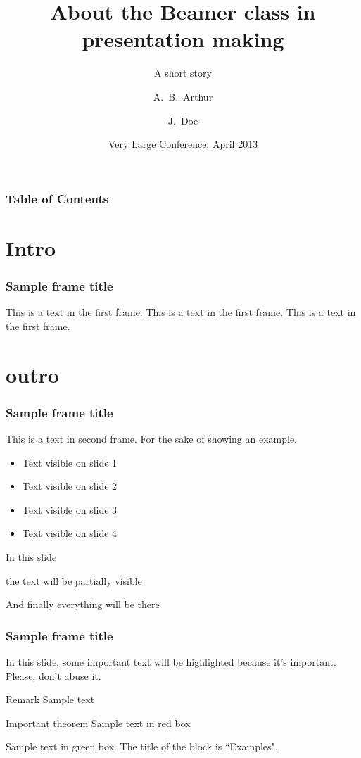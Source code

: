 \documentclass{beamer}
\title[About Beamer] %
{About the Beamer class in presentation making}
\subtitle{A short story}
\author[Arthur, Doe] %
{A.~B.~Arthur\inst{1} \and J.~Doe\inst{2}}
\institute[VFU] %
{
  \inst{1}%
  Faculty of Physics\\
  Very Famous University
  \and
  \inst{2}%
  Faculty of Chemistry\\
  Very Famous University
}
\date[VLC 2013] %
{Very Large Conference, April 2013}
\begin{document}
\frame{\titlepage}

\begin{frame}
\frametitle{Table of Contents}
\tableofcontents
\end{frame}

\section{Intro}

\begin{frame}
\frametitle{Sample frame title}
This is a text in the first frame. This is a text in the first frame. This is a text in the first frame.
\end{frame}

\section{outro}

\begin{frame}
\frametitle{Sample frame title}
This is a text in second frame.
For the sake of showing an example.

\begin{itemize}
 \item<1-> Text visible on slide 1
 \item<2-> Text visible on slide 2
 \item<3> Text visible on slide 3
 \item<4-> Text visible on slide 4
\end{itemize}

\end{frame}

\begin{frame}
 In this slide \pause

 the text will be partially visible \pause

 And finally everything will be there
\end{frame}

\begin{frame}
\frametitle{Sample frame title}

In this slide, some important text will be
\alert{highlighted} because it's important.
Please, don't abuse it.

\begin{block}{Remark}
Sample text
\end{block}

\begin{alertblock}{Important theorem}
Sample text in red box
\end{alertblock}

\begin{examples}
Sample text in green box. The title of the block is ``Examples".
\end{examples}
\end{frame}
\end{document}
